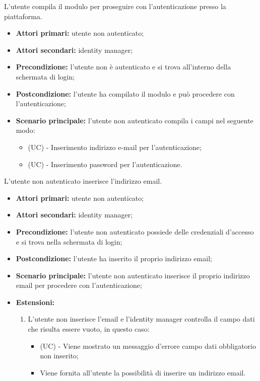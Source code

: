 \resetSubUC
{}
L'utente compila il modulo per proseguire con l'autenticazione presso la piattaforma.
\begin{itemize}
	\item \textbf{Attori primari:} utente non autenticato;
	\item \textbf{Attori secondari:} identity manager;
	\item \textbf{Precondizione:} l'utente non è autenticato e si trova all'interno della schermata di login;
	\item \textbf{Postcondizione:} l'utente ha compilato il modulo e può procedere con l'autenticazione;
	\item \textbf{Scenario principale:} l'utente non autenticato compila i campi nel seguente modo:
	\begin{itemize}
		\item (UC) - Inserimento indirizzo e-mail per l'autenticazione;
		\item (UC) - Inserimento password per l'autenticazione.
	\end{itemize}
\end{itemize}

L'utente non autenticato inserisce l'indirizzo email.
\begin{itemize}
	\item \textbf{Attori primari:} utente non autenticato;
	\item \textbf{Attori secondari:} identity manager;
	\item \textbf{Precondizione:} l'utente non autenticato possiede delle credenziali d'accesso e si trova nella schermata di login;
	\item \textbf{Postcondizione:}  l'utente ha inserito il proprio indirizzo email;
	\item \textbf{Scenario principale:} l'utente non autenticato inserisce il proprio indirizzo email per procedere con l'autenticazione;
	\item \textbf{Estensioni:}
	\begin{enumerate}[label=\lett]
		\item L'utente non inserisce l'email e l'identity manager controlla il campo dati che risulta essere vuoto, in questo caso:
		\begin{itemize}
			\item (UC) - Viene mostrato un messaggio d'errore campo dati obbligatorio non inserito;
			\item Viene fornita all'utente la possibilità di inserire un indirizzo email.
		\end{itemize}
	\end{enumerate}
\end{itemize}

